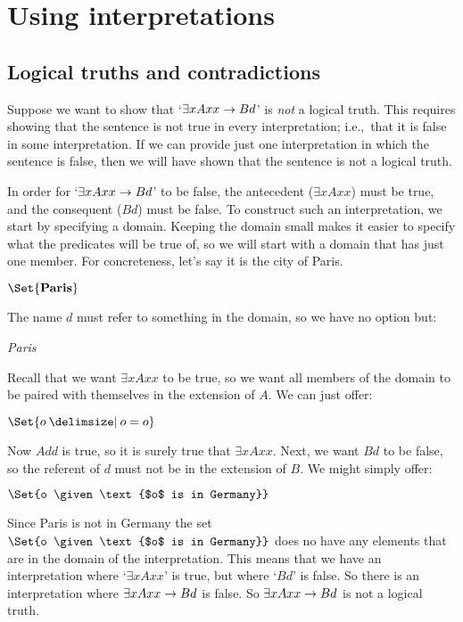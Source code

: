 \chapter{Using interpretations}
\label{sec.UsingModels}

\section{Logical truths and contradictions}
Suppose we want to show that `$\exists xAxx \rightarrow Bd$' is \emph{not} a logical truth. This requires showing that the sentence is not true in every interpretation; i.e.,\ that it is false in some interpretation. If we can provide just one interpretation in which the sentence is false, then we will have shown that the sentence is not a logical truth.

In order for `$\exists xAxx \rightarrow Bd$' to be false, the antecedent ($\exists x Axx$) must be true, and the consequent ($Bd$) must be false. To construct such an interpretation, we start by specifying a domain. Keeping the domain small makes it easier to specify what the predicates will be true of, so we will start with a domain that has just one member. For concreteness, let's say it is the city of Paris.
	\begin{interp}
		\item[\domain] $\Set{\emph{Paris}}$
	\end{interp}
The name $d$ must refer to something in the domain, so we have no option but:
	\begin{interp}
		\item[\denote{d}] \emph{Paris}
	\end{interp}
Recall that we want $\exists x Axx$ to be true, so we want all members of the domain to be paired with themselves in the extension of $A$. We can just offer:
	\begin{interp}
		\item[\denote{A}] $\Set{o \given  o=o}$
	\end{interp}
Now $Add$ is true, so it is surely true that $\exists x Axx$. Next, we want $Bd$ to be false, so the referent of $d$ must not be in the extension of $B$. We might simply offer:
	\begin{interp}
		\item[\denote{B}] $\Set{o \given \text{$o$ is in Germany}}$
	\end{interp}
Since Paris is not in Germany the set $\Set{o \given \text{$o$ is in Germany}}$ does no have any elements that are in the domain of the interpretation. This means that we have an interpretation where `$\exists x Axx$' is true, but where `$Bd$' is false. So there is an interpretation where $\exists x Axx \rightarrow Bd$ is false. So $\exists x Axx \rightarrow Bd$ is not a logical truth.

